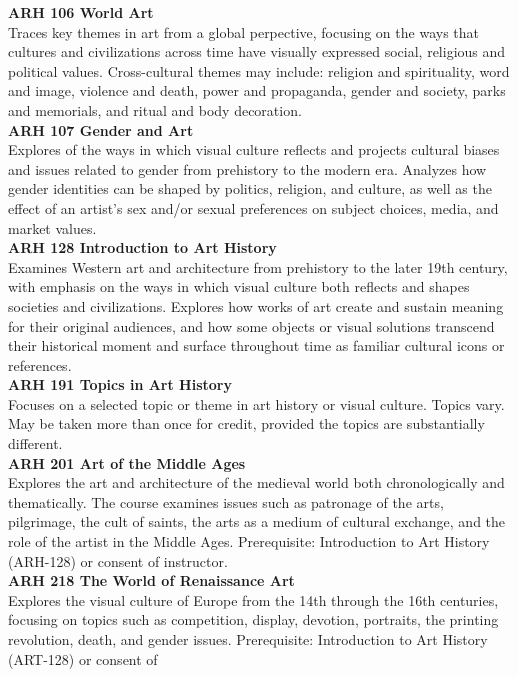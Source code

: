 \documentclass[
  letterpaper,
]{scrbook}
\begin{document}
\textbf{ARH 106 World Art}\\
Traces key themes in art from a global perpective, focusing on the ways
that cultures and civilizations across time have visually expressed
social, religious and political values. Cross-cultural themes may
include: religion and spirituality, word and image, violence and death,
power and propaganda, gender and society, parks and memorials, and
ritual and body decoration.\\
\textbf{ARH 107 Gender and Art}\\
Explores of the ways in which visual culture reflects and projects
cultural biases and issues related to gender from prehistory to the
modern era. Analyzes how gender identities can be shaped by politics,
religion, and culture, as well as the effect of an artist's sex and/or
sexual preferences on subject choices, media, and market values.\\
\textbf{ARH 128 Introduction to Art History}\\
Examines Western art and architecture from prehistory to the later 19th
century, with emphasis on the ways in which visual culture both reflects
and shapes societies and civilizations. Explores how works of art create
and sustain meaning for their original audiences, and how some objects
or visual solutions transcend their historical moment and surface
throughout time as familiar cultural icons or references.\\
\textbf{ARH 191 Topics in Art History}\\
Focuses on a selected topic or theme in art history or visual culture.
Topics vary. May be taken more than once for credit, provided the topics
are substantially different.\\
\textbf{ARH 201 Art of the Middle Ages}\\
Explores the art and architecture of the medieval world both
chronologically and thematically. The course examines issues such as
patronage of the arts, pilgrimage, the cult of saints, the arts as a
medium of cultural exchange, and the role of the artist in the Middle
Ages. Prerequisite: Introduction to Art History (ARH-128) or consent of
instructor.\\
\textbf{ARH 218 The World of Renaissance Art}\\
Explores the visual culture of Europe from the 14th through the 16th
centuries, focusing on topics such as competition, display, devotion,
portraits, the printing revolution, death, and gender issues.
Prerequisite: Introduction to Art History (ART-128) or consent of
\end{document}
